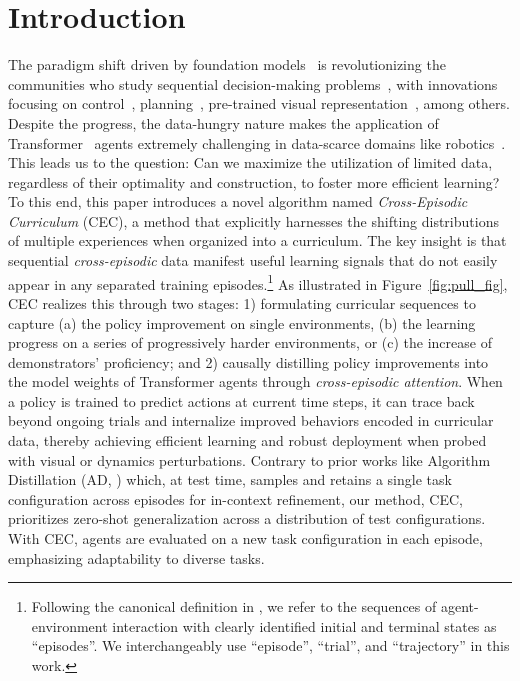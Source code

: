 \documentclass{article}
\newcommand{\cec}[0]{\mbox{CEC}\xspace}
\begin{document}
\section{Introduction}
\label{sec:introduction}
The paradigm shift driven by foundation models~\citep{bommasani2021opportunities} is revolutionizing the communities who study sequential decision-making problems~\citep{yang2023foundation}, with innovations focusing on control~\citep{ahn2022saycan,liang2022code,jiang2022vima,brohan2022rt1}, planning~\citep{wang2023voyager,huang2022language,huang2022inner,wang2023describe,driess2023palme}, pre-trained visual representation~\citep{nair2022r3m,ma2022vip,radosavovic2022realworld,majumdar2023search}, among others.
Despite the progress, the data-hungry nature makes the application of Transformer~\citep{vaswani2017attention} agents extremely challenging in data-scarce domains like robotics~\citep{mandlekar2018roboturk,mandlekar2021matters,ebert2021bridge,jiang2022vima,brohan2022rt1}.
This leads us to the question: Can we maximize the utilization of limited data, regardless of their optimality and construction, to foster more efficient learning?
To this end, this paper introduces a novel algorithm named \textit{Cross-Episodic Curriculum} (\cec), a method that explicitly harnesses the shifting distributions of multiple experiences when organized into a curriculum.
The key insight is that sequential \textit{cross-episodic} data manifest useful learning signals that do not easily appear in any separated training episodes.\footnote{Following the canonical definition in \citet{sutton2018reinforcement}, we refer to the sequences of agent-environment interaction with clearly identified initial and terminal states as ``episodes''. We interchangeably use ``episode'', ``trial'', and ``trajectory'' in this work.}
As illustrated in Figure~\ref{fig:pull_fig}, \cec realizes this through two stages: 1) formulating curricular sequences to capture (a) the policy improvement on single environments, (b) the learning progress on a series of progressively harder environments, or (c) the increase of demonstrators' proficiency;
and 2) causally distilling policy improvements into the model weights of Transformer agents through \emph{cross-episodic attention}.
When a policy is trained to predict actions at current time steps, it can trace back beyond ongoing trials and internalize improved behaviors encoded in curricular data, thereby achieving efficient learning and robust deployment when probed with visual or dynamics perturbations.
Contrary to prior works like Algorithm Distillation (AD, \citet{laskin2023incontext}) which, at test time, samples and retains a single task configuration across episodes for in-context refinement, our method, \cec, prioritizes zero-shot generalization across a distribution of test configurations. With \cec, agents are evaluated on a new task configuration in each episode, emphasizing adaptability to diverse tasks.
\end{document}
